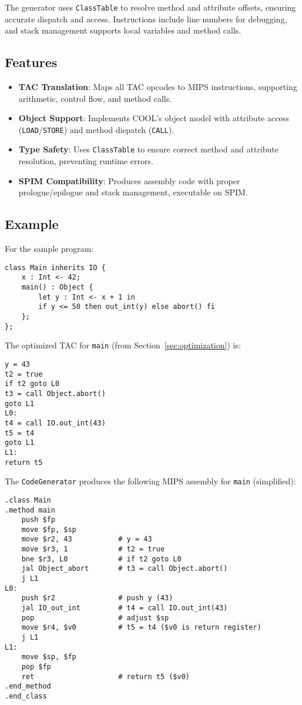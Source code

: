 \documentclass[11pt, titlepage]{article}
\begin{document}
The generator uses \texttt{ClassTable} to resolve method and attribute offsets, ensuring accurate dispatch and access. Instructions include line numbers for debugging, and stack management supports local variables and method calls.

\subsection{Features}
\begin{itemize}[leftmargin=*]
    \item \textbf{TAC Translation}: Maps all TAC opcodes to MIPS instructions, supporting arithmetic, control flow, and method calls.
    \item \textbf{Object Support}: Implements COOL's object model with attribute access (\texttt{LOAD}/\texttt{STORE}) and method dispatch (\texttt{CALL}).
    \item \textbf{Type Safety}: Uses \texttt{ClassTable} to ensure correct method and attribute resolution, preventing runtime errors.
    \item \textbf{SPIM Compatibility}: Produces assembly code with proper prologue/epilogue and stack management, executable on SPIM.
\end{itemize}

\subsection{Example}
For the sample program:
\begin{lstlisting}
class Main inherits IO {
    x : Int <- 42;
    main() : Object {
        let y : Int <- x + 1 in
        if y <= 50 then out_int(y) else abort() fi
    };
};
\end{lstlisting}
The optimized TAC for \texttt{main} (from Section~\ref{sec:optimization}) is:
\begin{lstlisting}
y = 43
t2 = true
if t2 goto L0
t3 = call Object.abort()
goto L1
L0:
t4 = call IO.out_int(43)
t5 = t4
goto L1
L1:
return t5
\end{lstlisting}

The \texttt{CodeGenerator} produces the following MIPS assembly for \texttt{main} (simplified):
\begin{lstlisting}
.class Main
.method main
    push $fp
    move $fp, $sp
    move $r2, 43           # y = 43
    move $r3, 1            # t2 = true
    bne $r3, L0            # if t2 goto L0
    jal Object_abort       # t3 = call Object.abort()
    j L1
L0:
    push $r2               # push y (43)
    jal IO_out_int         # t4 = call IO.out_int(43)
    pop                    # adjust $sp
    move $r4, $v0          # t5 = t4 ($v0 is return register)
    j L1
L1:
    move $sp, $fp
    pop $fp
    ret                    # return t5 ($v0)
.end_method
.end_class
\end{lstlisting}
\end{document}

